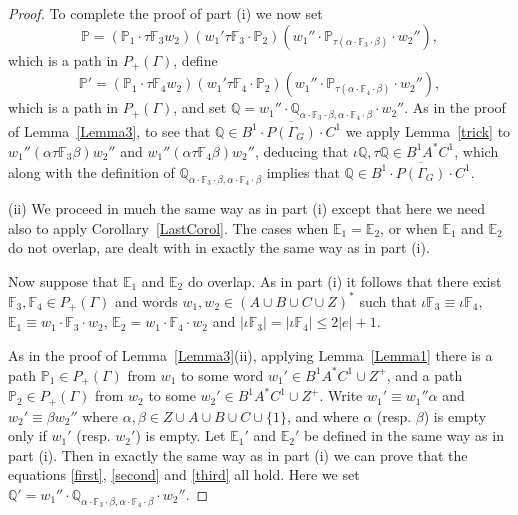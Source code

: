 \documentclass[11pt]{amsart}
\theoremstyle{plain}
\begin{document}
\begin{proof}
To complete the proof of part (i) we now set 
\[
{\mathbb{P}} = ({\mathbb{P}}_1 \cdot \tau {\mathbb{F}}_3 w_2)
(w_1' \tau {\mathbb{F}}_3 \cdot {\mathbb{P}}_2)
(w_1'' \cdot  {\mathbb{P}}_{\tau(\alpha \cdot {\mathbb{F}}_3 \cdot \beta)}  \cdot w_2''),
\]
which is a path in $P_+(\Gamma)$, define
\[
{\mathbb{P}}' = ({\mathbb{P}}_1 \cdot \tau {\mathbb{F}}_4 w_2)
(w_1' \tau {\mathbb{F}}_4 \cdot {\mathbb{P}}_2)
(w_1'' \cdot  {\mathbb{P}}_{\tau(\alpha \cdot {\mathbb{F}}_4 \cdot \beta)}  \cdot w_2''),
\]
which is a path in $P_+(\Gamma)$, and set ${\mathbb{Q}} = w_1'' \cdot {\mathbb{Q}}_{\alpha \cdot {\mathbb{F}}_3 \cdot \beta, \alpha \cdot {\mathbb{F}}_4 \cdot \beta} \cdot w_2''$. As in the proof of Lemma~\ref{Lemma3}, to see that 
${\mathbb{Q}} \in \overline{B^1 \cdot P(\Gamma_G) \cdot C^1}$ we apply Lemma~\ref{trick} to $w_1'' (\alpha \tau {\mathbb{F}}_3 \beta) w_2''$ and $w_1'' (\alpha \tau {\mathbb{F}}_4 \beta) w_2''$, deducing that $\iota {\mathbb{Q}}, \tau {\mathbb{Q}} \in B^1 A^* C^1$, which along with the definition of ${\mathbb{Q}}_{\alpha \cdot {\mathbb{F}}_3 \cdot \beta, \alpha \cdot {\mathbb{F}}_4 \cdot \beta}$ implies that ${\mathbb{Q}} \in \overline{B^1 \cdot P(\Gamma_G) \cdot C^1}$.  

(ii) We proceed in much the same way as in part (i) except that here we need also to apply Corollary~\ref{LastCorol}. The cases when ${\mathbb{E}}_1 = {\mathbb{E}}_2$, or when ${\mathbb{E}}_1$ and ${\mathbb{E}}_2$ do not overlap, are dealt with in exactly the same way as in part (i).

Now suppose that ${\mathbb{E}}_1$ and ${\mathbb{E}}_2$ do overlap. As in part (i) it follows that there exist ${\mathbb{F}}_3, {\mathbb{F}}_4 \in P_+(\Gamma)$ and words $w_1, w_2 \in (A \cup B \cup C \cup Z)^*$ such that $\iota {\mathbb{F}}_3 \equiv \iota {\mathbb{F}}_4$, ${\mathbb{E}}_1 \equiv w_1 \cdot {\mathbb{F}}_3 \cdot w_2$, ${\mathbb{E}}_2 = w_1 \cdot {\mathbb{F}}_4 \cdot w_2$ and $|\iota {\mathbb{F}}_3 | = |\iota {\mathbb{F}}_4| \leq 2 |e| + 1$. 

As in the proof of Lemma~\ref{Lemma3}(ii), applying Lemma~\ref{Lemma1} there is a path ${\mathbb{P}}_1 \in P_+(\Gamma)$ from $w_1$ to some word $w_1' \in B^1 A^* C^1 \cup Z^+$, and a path ${\mathbb{P}}_2 \in P_+(\Gamma)$ from $w_2$ to some $w_2' \in B^1 A^* C^1 \cup Z^+$. Write $w_1' \equiv w_1'' \alpha$ and $w_2' \equiv \beta w_2''$ where $\alpha, \beta \in Z \cup A \cup B \cup C \cup \{1 \}$, and where $\alpha$ (resp. $\beta$) is empty only if $w_1'$ (resp. $w_2'$) is empty. Let ${\mathbb{E}}_1'$ and ${\mathbb{E}}_2'$ be defined in the same way as in part (i). Then in exactly the same way as in part (i) we can prove that the equations \eqref{first}, \eqref{second} and \eqref{third} all hold. Here we set ${\mathbb{Q}}' = w_1'' \cdot {\mathbb{Q}}_{\alpha \cdot {\mathbb{F}}_3 \cdot \beta, \alpha \cdot {\mathbb{F}}_4 \cdot \beta} \cdot w_2''$. 


\end{proof}
\end{document}
